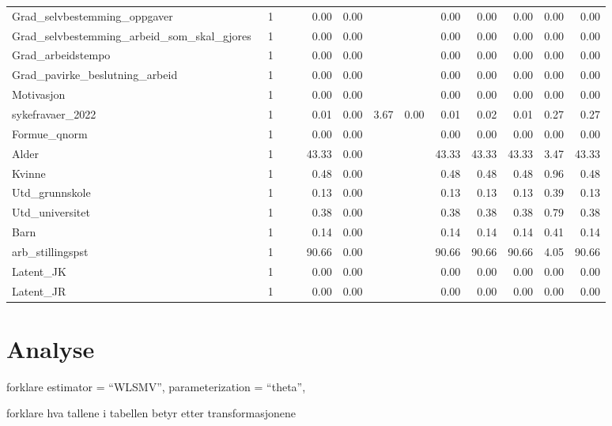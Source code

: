 \documentclass[
  12pt,
  a4paper,
  DIV=11,
  numbers=noendperiod]{scrartcl}
\begin{document}
\begin{table}[ht]
\begin{tabular}{llllrrrrrrrrr}
  Grad\_selvbestemming\_oppgaver & ~1 &  &  & 0.00 & 0.00 &  &  & 0.00 & 0.00 & 0.00 & 0.00 & 0.00 \\ 
  Grad\_selvbestemming\_arbeid\_som\_skal\_gjores & ~1 &  &  & 0.00 & 0.00 &  &  & 0.00 & 0.00 & 0.00 & 0.00 & 0.00 \\ 
  Grad\_arbeidstempo & ~1 &  &  & 0.00 & 0.00 &  &  & 0.00 & 0.00 & 0.00 & 0.00 & 0.00 \\ 
  Grad\_pavirke\_beslutning\_arbeid & ~1 &  &  & 0.00 & 0.00 &  &  & 0.00 & 0.00 & 0.00 & 0.00 & 0.00 \\ 
  Motivasjon & ~1 &  &  & 0.00 & 0.00 &  &  & 0.00 & 0.00 & 0.00 & 0.00 & 0.00 \\ 
  sykefravaer\_2022 & ~1 &  &  & 0.01 & 0.00 & 3.67 & 0.00 & 0.01 & 0.02 & 0.01 & 0.27 & 0.27 \\ 
  Formue\_qnorm & ~1 &  &  & 0.00 & 0.00 &  &  & 0.00 & 0.00 & 0.00 & 0.00 & 0.00 \\ 
  Alder & ~1 &  &  & 43.33 & 0.00 &  &  & 43.33 & 43.33 & 43.33 & 3.47 & 43.33 \\ 
  Kvinne & ~1 &  &  & 0.48 & 0.00 &  &  & 0.48 & 0.48 & 0.48 & 0.96 & 0.48 \\ 
  Utd\_grunnskole & ~1 &  &  & 0.13 & 0.00 &  &  & 0.13 & 0.13 & 0.13 & 0.39 & 0.13 \\ 
  Utd\_universitet & ~1 &  &  & 0.38 & 0.00 &  &  & 0.38 & 0.38 & 0.38 & 0.79 & 0.38 \\ 
  Barn & ~1 &  &  & 0.14 & 0.00 &  &  & 0.14 & 0.14 & 0.14 & 0.41 & 0.14 \\ 
  arb\_stillingspst & ~1 &  &  & 90.66 & 0.00 &  &  & 90.66 & 90.66 & 90.66 & 4.05 & 90.66 \\ 
  Latent\_JK & ~1 &  &  & 0.00 & 0.00 &  &  & 0.00 & 0.00 & 0.00 & 0.00 & 0.00 \\ 
  Latent\_JR & ~1 &  &  & 0.00 & 0.00 &  &  & 0.00 & 0.00 & 0.00 & 0.00 & 0.00 \\ 
   \bottomrule
\end{tabular}
\end{table}

\newpage

\section{Analyse}\label{analyse}

forklare estimator = ``WLSMV'', parameterization = ``theta'',

forklare hva tallene i tabellen betyr etter transformasjonene
\end{document}
